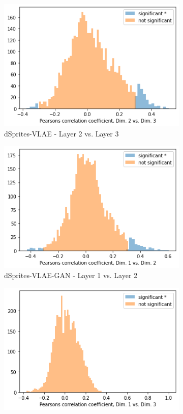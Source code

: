 \begin{figure}
\begin{subfigure}{.3\textwidth}
        \includegraphics[width=\textwidth]{images/notprop/dsprites/vlae/dim_2_3.png}
        \caption{dSprites-VLAE - Layer 2 vs. Layer 3}
    \end{subfigure}
    \begin{subfigure}{.3\textwidth}
        \includegraphics[width=\textwidth]{images/notprop/dsprites/vlae_gan/dim_1_2.png}
        \caption{dSprites-VLAE-GAN - Layer 1 vs. Layer 2}
    \end{subfigure}
    \hfill
    \begin{subfigure}{.3\textwidth}
        \includegraphics[width=\textwidth]{images/notprop/dsprites/vlae_gan/dim_1_3.png}

\end{subfigure}
\end{figure}
